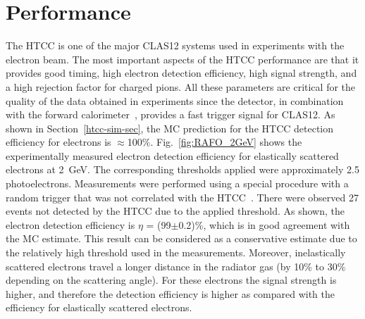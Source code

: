 \section{Performance}

The HTCC is one of the major CLAS12 systems used in experiments with the electron beam. The most important
aspects of the HTCC performance are that it provides good timing, high electron detection efficiency, high signal
strength, and a high rejection factor for charged pions. All these parameters are critical for the quality of the data
obtained in experiments since the detector, in combination with the forward calorimeter~\cite{ec-nim}, provides a
fast trigger signal for CLAS12. As shown in Section~\ref{htcc-sim-sec}, the MC prediction for the HTCC
detection efficiency for electrons is $\approx$100\%. Fig.~\ref{fig:RAFO_2GeV} shows the experimentally
measured electron detection efficiency for elastically scattered electrons at 2~GeV. The corresponding thresholds
applied were approximately 2.5 photoelectrons. Measurements were performed using a special procedure with a
random trigger that was not correlated with the HTCC~\cite{trigger-nim}. There were observed 27 events not
detected by the HTCC due to the applied threshold. As shown, the electron detection efficiency is $\eta$ =
(99$\pm$0.2)\%, which is in good agreement with the MC estimate. This result can be considered as a conservative
estimate due to the relatively high threshold used in the measurements. Moreover, inelastically scattered electrons
travel a longer distance in the radiator gas (by 10\% to 30\% depending on the scattering angle). For these electrons
the signal strength is higher, and therefore the detection efficiency is higher as compared with the efficiency for
elastically scattered electrons.   


